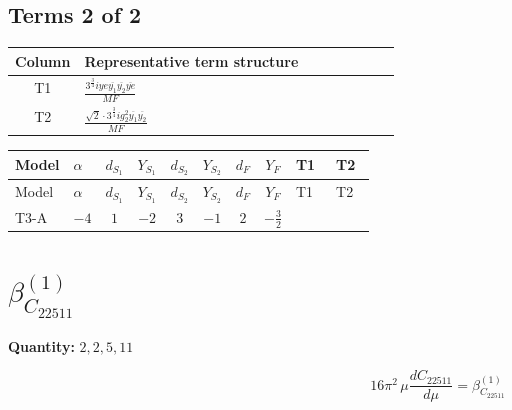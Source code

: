 \documentclass[8pt]{article}
\begin{document}
\begin{landscape}
\subsection*{Terms 2 of 2}
\begin{center}
\begin{tabular}{@{}c >{\raggedright\arraybackslash}p{0.82\linewidth}@{}}
\toprule
Column & Representative term structure \\
\midrule
T1 & \(\displaystyle \frac{3^{\frac{3}{4}} i ye \overline{y_{1}} \overline{y_{2}} \overline{ye}}{MF}\) \\
\midrule
T2 & \(\displaystyle \frac{\sqrt{2} \cdot 3^{\frac{3}{4}} i g_{2}^{2} \overline{y_{1}} \overline{y_{2}}}{MF}\) \\
\midrule
\bottomrule
\end{tabular}
\end{center}
\smallskip
\tiny
\begin{longtable}{@{}llcccccc >{\raggedright\arraybackslash}p{0.21\linewidth} >{\raggedright\arraybackslash}p{0.21\linewidth}@{}}
\toprule
Model & $\alpha$ & $d_{S_1}$ & $Y_{S_1}$ & $d_{S_2}$ & $Y_{S_2}$ & $d_F$ & $Y_F$ & T1 & T2 \\
\midrule
\endfirsthead
\toprule
Model & $\alpha$ & $d_{S_1}$ & $Y_{S_1}$ & $d_{S_2}$ & $Y_{S_2}$ & $d_F$ & $Y_F$ & T1 & T2 \\
\midrule
\endhead
T3-A & $-4$ & $1$ & $-2$ & $3$ & $-1$ & $2$ & $-\frac{3}{2}$ & \scriptsize\adjustbox{max width=\linewidth}{$\begin{gathered} - \frac{3^{\frac{3}{4}} i ye \overline{y_{1}} \overline{y_{2}} \overline{ye}}{12 MF}\end{gathered}$} & \scriptsize\adjustbox{max width=\linewidth}{$\begin{gathered} \frac{\sqrt{2} \cdot 3^{\frac{3}{4}} i g_{2}^{2} \overline{y_{1}} \overline{y_{2}}}{3 MF}\end{gathered}$} \\
\midrule
\bottomrule
\end{longtable}
\clearpage
\section*{$\beta_{C_{22511}}^{(1)}$}
\noindent\textbf{Quantity: }$\mathrm{2,2,5,11}$\par\smallskip
\[16\pi^2\,\mu\frac{d C_{22511}}{d\mu}=\beta_{C_{22511}}^{(1)}\]

\end{landscape}
\end{document}
